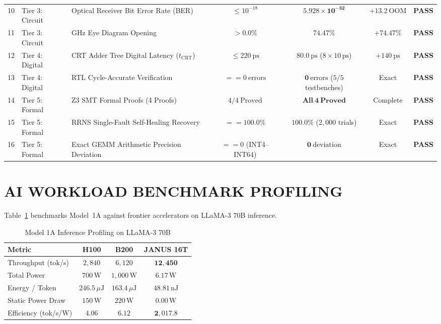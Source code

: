 \documentclass[journal]{IEEEtran}
\begin{document}
\begin{table}[!htbp]
\begin{tabularx}{\textwidth}{c l >{\raggedright\arraybackslash}X c c c c}
10 & Tier 3: Circuit & Optical Receiver Bit Error Rate (BER) & $\le 10^{-18}$ & $\mathbf{5.928 \times 10^{-32}}$ & $+13.2~\mathrm{OOM}$ & \textbf{PASS} \\
11 & Tier 3: Circuit & 100 GHz Eye Diagram Opening & $> 0.0\%$ & $\mathbf{74.47\%}$ & $+74.47\%$ & \textbf{PASS} \\
\midrule
12 & Tier 4: Digital & CRT Adder Tree Digital Latency ($t_{\mathrm{CRT}}$) & $\le 220~\mathrm{ps}$ & $\mathbf{80.0~\mathrm{ps}}$ ($8\times 10\,\mathrm{ps}$) & $+140~\mathrm{ps}$ & \textbf{PASS} \\
13 & Tier 4: Digital & RTL Cycle-Accurate Verification & $== 0~\mathrm{errors}$ & $\mathbf{0~\mathrm{errors}}$ ($5/5$ testbenches) & Exact & \textbf{PASS} \\
\midrule
14 & Tier 5: Formal & Z3 SMT Formal Proofs (4 Proofs) & $4 / 4~\mathrm{Proved}$ & $\mathbf{All~4~Proved}$ & Complete & \textbf{PASS} \\
15 & Tier 5: Formal & RRNS Single-Fault Self-Healing Recovery & $== 100.0\%$ & $\mathbf{100.0\%}$ ($2,000$ trials) & Exact & \textbf{PASS} \\
16 & Tier 5: Formal & Exact GEMM Arithmetic Precision Deviation & $== 0$ (INT4--INT64) & $\mathbf{0~\mathrm{deviation}}$ & Exact & \textbf{PASS} \\
\bottomrule
\end{tabularx}
\end{table}

\section{AI WORKLOAD BENCHMARK PROFILING}

Table~\ref{tab:ai_benchmarks} benchmarks Model~1A against frontier accelerators on LLaMA-3 70B inference.

\begin{table}[!htbp]
\centering
\footnotesize
\caption{Model 1A Inference Profiling on LLaMA-3 70B}
\label{tab:ai_benchmarks}
\begin{tabularx}{\columnwidth}{>{\raggedright\arraybackslash}X c c c}
\toprule
\textbf{Metric} & \textbf{H100} & \textbf{B200} & \textbf{JANUS 16T} \\
\midrule
Throughput (tok/s) & $2,840$ & $6,120$ & $\mathbf{12,450}$ \\
Total Power & $700\,\mathrm{W}$ & $1,000\,\mathrm{W}$ & $\mathbf{6.17\,\mathrm{W}}$ \\
Energy / Token & $246.5\,\mu\mathrm{J}$ & $163.4\,\mu\mathrm{J}$ & $\mathbf{48.81\,\mathrm{nJ}}$ \\
Static Power Draw & $150\,\mathrm{W}$ & $220\,\mathrm{W}$ & $\mathbf{0.00\,\mathrm{W}}$ \\
Efficiency (tok/s/W) & $4.06$ & $6.12$ & $\mathbf{2,017.8}$ \\
\bottomrule
\end{tabularx}
\end{table}
\end{document}
